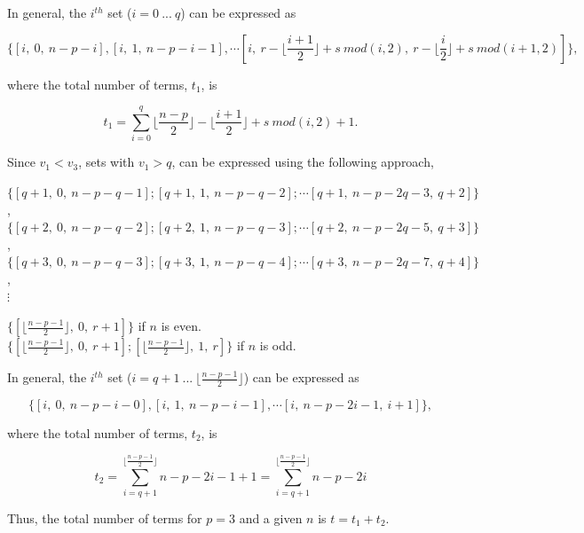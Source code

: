 \documentclass[3p,times]{elsarticle}
\begin{document}
In general, the $i^{th}$ set ($i=0\ ...\ q$) can be expressed as 

\begin{equation}
\{[i,\ 0,\ n-p-i], [i,\ 1,\ n-p-i-1], \cdots [i,\ r-\lfloor \frac{i+1}{2}\rfloor+s\ mod(i,2),\ r-\lfloor \frac{i}{2}\rfloor+s\ mod(i+1,2)]\},
\end{equation}

\noindent where the total number of terms, $t_1$, is

\begin{equation}
t_1=\sum_{i=0}^{q} \lfloor\frac{n-p}{2}\rfloor-\lfloor\frac{i+1}{2}\rfloor+s\ mod(i,2)+1.
\end{equation}

\noindent Since $v_1<v_3$, sets with $v_1>q$, can be expressed using the following approach,

\begin{center}
$\{[q+1,\ 0,\ n-p-q-1]; [q+1,\ 1,\ n-p-q-2]; \cdots [q+1,\ n-p-2q-3,\ q+2]\}$,\\
$\{[q+2,\ 0,\ n-p-q-2]; [q+2,\ 1,\ n-p-q-3]; \cdots [q+2,\ n-p-2q-5,\ q+3]\}$,\\
$\{[q+3,\ 0,\ n-p-q-3]; [q+3,\ 1,\ n-p-q-4]; \cdots [q+3,\ n-p-2q-7,\ q+4]\}$,\\
$\vdots$ \\
\end{center}

\begin{center}
$\{[\lfloor\frac{n-p-1}{2}\rfloor,\ 0,\ r+1]\}$ if $n$ is even.\\
$\{[\lfloor\frac{n-p-1}{2}\rfloor,\ 0,\ r+1]; [\lfloor\frac{n-p-1}{2}\rfloor,\ 1,\ r]\}$ if $n$ is odd.
\end{center} 

\noindent In general, the $i^{th}$ set ($i=q+1\ ...\ \lfloor\frac{n-p-1}{2}\rfloor$) can be expressed as 

\begin{equation}
\{[i,\ 0,\ n-p-i-0], [i,\ 1,\ n-p-i-1], \cdots [i,\ n-p-2i-1,\ i+1]\},
\end{equation}

\noindent where the total number of terms, $t_2$, is

\begin{equation}
t_2=\sum_{i=q+1}^{\lfloor\frac{n-p-1}{2}\rfloor} n-p-2i-1+1 =\sum_{i=q+1}^{\lfloor\frac{n-p-1}{2}\rfloor} n-p-2i
\end{equation}

\noindent Thus, the total number of terms for $p=3$ and a given $n$ is $t=t_1+t_2$.  
\end{document}
